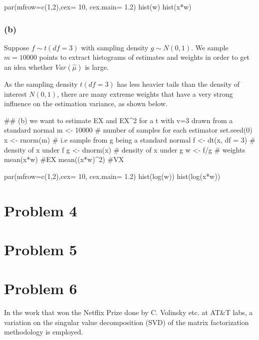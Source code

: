 \documentclass{article}
\begin{document}
par(mfrow=c(1,2),cex= 10, cex.main= 1.2)
hist(w)
hist(x*w)


\subsubsection*{(b)}
\hspace{12 pt} Suppose $f\sim t(df=3)$ with sampling density $g\sim N(0,1)$. We sample $m=10000$ points
to extract histograms of estimates and weights in order to get an idea whether $Var(\hat\mu)$ is large.

As the sampling density $t(df=3)$ has less heavier tails than the density of interest $N(0,1)$, there are
many extreme weights that have a very strong influence on the estimation variance, as shown below.


## (b) we want to estimate EX and EX^2 for a t with v=3 drawn from a standard normal
m <- 10000 # number of samples for each estimator
set.seed(0)
x <- rnorm(m)  # i.e sample from g being a standard normal
f <- dt(x, df = 3)  # density of x under f
g <- dnorm(x)  # density of x under g
w <- f/g  # weights
mean(x*w) #EX
mean((x*w)^2) #VX

par(mfrow=c(1,2),cex= 10, cex.main= 1.2)
hist(log(w))
hist(log(x*w))



\newpage
\section*{Problem 4}










\newpage
\section*{Problem 5}















\newpage
\section*{Problem 6}
\hspace{12 pt} In the work that won the Netflix Prize done by C. Volinsky etc. at AT\&T labs, a variation
on the singular value decomposition (SVD) of the matrix factorization methodology is employed.
\end{document}
